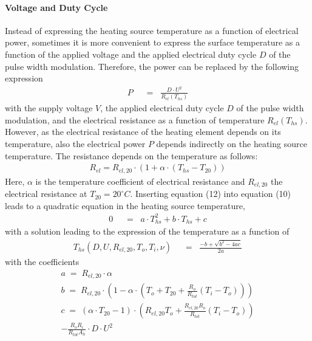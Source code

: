 \paragraph{Voltage and Duty Cycle}
Instead of expressing the heating source temperature as a function of electrical power, sometimes it is more convenient to express the surface temperature as a function of the applied voltage and the applied electrical duty cycle \(D\) of the pulse width modulation. Therefore, the power can be replaced by the following expression
\begin{align}
P \;\; &= \;\; \frac{D\cdot U^2}{R_{el}(T_{hs})}
\end{align}
with the supply voltage \(V\), the applied electrical duty cycle \(D\) of the pulse width modulation, and the electrical resistance as a function of temperature \(R_{el}(T_{hs})\). However, as the electrical resistance of the heating element depends on its temperature, also the electrical power \(P\) depends indirectly on the heating source temperature. The resistance depends on the temperature as follows:
\begin{align}
R_{el} = R_{el,20}\cdot(1 + \alpha\cdot (T_{hs}-T_{20}))
\end{align}
Here, \(\alpha\) is the temperature coefficient of electrical resistance and \(R_{el,20}\) the electrical resistance at \(T_{20} = 20^{\circ}C\). Inserting equation (12) into equation (10) leads to a quadratic equation in the heating source temperature,
\begin{align}
0 \;\; &= \;\; a\cdot T_{hs}^2 + b\cdot T_{hs} + c  
\end{align}
with a solution leading to the expression of the temperature as a function of 
\begin{align}
T_{hs}(D,U,R_{el,20},T_o,T_i,\nu) \;\; &= \;\; \frac{-b + \sqrt{b^2-4ac}}{2a}
\end{align}
with the coefficients
\begin{multline}
a \; = \; R_{el,20}\cdot \alpha \\
b \; = \; R_{el,20}\cdot\left(1-\alpha\cdot(T_o+T_{20}+\frac{R_o}{R_{tot}}(T_i-T_o))\right) \\
c \; = \; (\alpha\cdot T_{20}-1)\cdot\left(R_{el,20}T_o + \frac{R_{el,20}R_o}{R_{tot}}(T_i - T_o)\right) \\
- \frac{R_oR_i}{R_{tot}A_h}\cdot D\cdot U^2
\end{multline}


